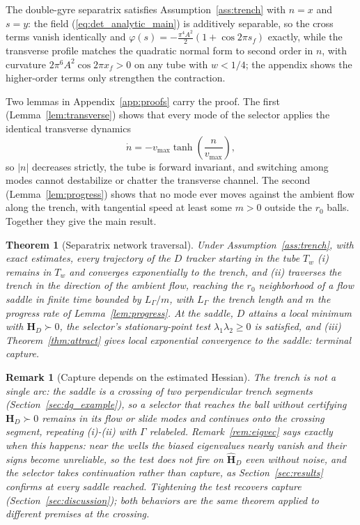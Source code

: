 \documentclass[lettersize,journal]{IEEEtran}
\newtheorem{theorem}{Theorem}
\newtheorem{remark}{Remark}
\begin{document}
The double-gyre separatrix satisfies Assumption~\ref{ass:trench} with
$n = x$ and $s = y$: the field (\ref{eq:det_analytic_main}) is
additively separable, so the cross terms vanish identically and
$\varphi(s) = -\tfrac{\pi^4 A^2}{2}(1 + \cos 2\pi s_f)$ exactly, while
the transverse profile matches the quadratic normal form to second
order in $n$, with curvature $2\pi^6 A^2 \cos 2\pi x_f > 0$ on any tube
with $w < 1/4$; the appendix shows the higher-order terms only
strengthen the contraction.

Two lemmas in Appendix~\ref{app:proofs} carry the proof. The first
(Lemma~\ref{lem:transverse}) shows that every mode of the selector
applies the identical transverse dynamics
\begin{equation}
    \dot{n} = -v_{\max}\tanh\!\left(\frac{n}{v_{\max}}\right),
    \label{eq:n_dynamics}
\end{equation}
so $|n|$ decreases strictly, the tube is forward invariant, and
switching among modes cannot destabilize or chatter the transverse
channel. The second (Lemma~\ref{lem:progress}) shows that no mode ever
moves against the ambient flow along the trench, with tangential speed
at least some $m > 0$ outside the $r_0$ balls. Together they give the
main result.

\begin{theorem}[Separatrix network traversal]
\label{thm:separatrix}
Under Assumption~\ref{ass:trench}, with exact estimates, every
trajectory of the $D$ tracker starting in the tube $T_w$ (i) remains in
$T_w$ and converges exponentially to the trench, and (ii) traverses the
trench in the direction of the ambient flow, reaching the $r_0$
neighborhood of a flow saddle in finite time bounded by $L_\Gamma/m$,
with $L_\Gamma$ the trench length and $m$ the progress rate of
Lemma~\ref{lem:progress}. At the saddle, $D$ attains a local minimum
with $\mathbf{H}_D \succ 0$, the selector's stationary-point test
$\lambda_1\lambda_2 \geq 0$ is satisfied, and (iii)
Theorem~\ref{thm:attract} gives local exponential convergence to the
saddle: terminal capture.
\end{theorem}

\begin{remark}[Capture depends on the estimated Hessian]
\label{rem:capture_gap}
The trench is not a single arc: the saddle is a crossing of two
perpendicular trench segments (Section~\ref{sec:dg_example}), so a
selector that reaches the ball without certifying $\mathbf{H}_D \succ
0$ remains in its flow or slide modes and continues onto the crossing
segment, repeating (i)-(ii) with $\Gamma$ relabeled.
Remark~\ref{rem:eigvec} says exactly when this happens: near the wells
the biased eigenvalues nearly vanish and their signs become unreliable,
so the test does not fire on $\hat{\mathbf{H}}_D$ even without noise,
and the selector takes continuation rather than capture, as
Section~\ref{sec:results} confirms at every saddle reached. Tightening
the test recovers capture (Section~\ref{sec:discussion}); both
behaviors are the same theorem applied to different premises at the
crossing.
\end{remark}
\end{document}
